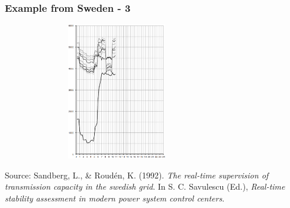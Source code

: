 \documentclass{beamer}
\begin{document}
\begin{frame}
\frametitle{Example from Sweden - 3}
\begin{center}
\includegraphics[height=6cm,width=0.75\textwidth]{Figs/SpicaResults.png}

\footnotesize{Source: Sandberg, L., \& Roudén, K. (1992). \textit{The real-time supervision of transmission capacity in the swedish grid}. In S. C. Savulescu (Ed.), \textit{Real-time stability assessment in modern power system control centers}.}
\end{center}
\end{frame}
\end{document}

